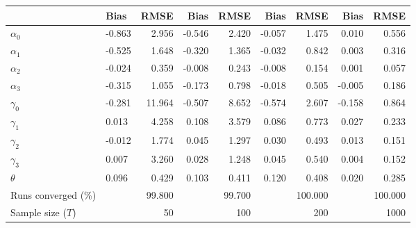 
\begin{tabular}[t]{llrrrrrrr}
\toprule
  & Bias & RMSE & Bias & RMSE & Bias & RMSE & Bias & RMSE\\
\midrule
$\alpha_{0}$ & -0.863 & 2.956 & -0.546 & 2.420 & -0.057 & 1.475 & 0.010 & 0.556\\
$\alpha_{1}$ & -0.525 & 1.648 & -0.320 & 1.365 & -0.032 & 0.842 & 0.003 & 0.316\\
$\alpha_{2}$ & -0.024 & 0.359 & -0.008 & 0.243 & -0.008 & 0.154 & 0.001 & 0.057\\
$\alpha_{3}$ & -0.315 & 1.055 & -0.173 & 0.798 & -0.018 & 0.505 & -0.005 & 0.186\\
$\gamma_{0}$ & -0.281 & 11.964 & -0.507 & 8.652 & -0.574 & 2.607 & -0.158 & 0.864\\
$\gamma_{1}$ & 0.013 & 4.258 & 0.108 & 3.579 & 0.086 & 0.773 & 0.027 & 0.233\\
$\gamma_{2}$ & -0.012 & 1.774 & 0.045 & 1.297 & 0.030 & 0.493 & 0.013 & 0.151\\
$\gamma_{3}$ & 0.007 & 3.260 & 0.028 & 1.248 & 0.045 & 0.540 & 0.004 & 0.152\\
$\theta$ & 0.096 & 0.429 & 0.103 & 0.411 & 0.120 & 0.408 & 0.020 & 0.285\\
Runs converged (\%) &  & 99.800 &  & 99.700 &  & 100.000 &  & 100.000\\
Sample size ($T$) &  & 50 &  & 100 &  & 200 &  & 1000\\
\bottomrule
\end{tabular}
